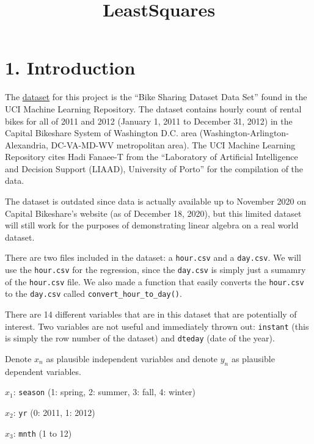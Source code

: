 \documentclass[
]{article}
\title{LeastSquares}
\author{}
\date{\vspace{-2.5em}}
\begin{document}
\maketitle

\newpage

\hypertarget{introduction}{%
\section{1. Introduction}\label{introduction}}

The \color{blue}
\href{https://www.archive.ics.uci.edu/ml/datasets/Bike+Sharing+Dataset}{dataset}
\color{black} for this project is the ``Bike Sharing Dataset Data Set''
found in the UCI Machine Learning Repository. The dataset contains
hourly count of rental bikes for all of 2011 and 2012 (January 1, 2011
to December 31, 2012) in the Capital Bikeshare System of Washington D.C.
area (Washington-Arlington-Alexandria, DC-VA-MD-WV metropolitan area).
The UCI Machine Learning Repository cites Hadi Fanaee-T from the
``Laboratory of Artificial Intelligence and Decision Support (LIAAD),
University of Porto'' for the compilation of the data.

The dataset is outdated since data is actually available up to November
2020 on Capital Bikeshare's website (as of December 18, 2020), but this
limited dataset will still work for the purposes of demonstrating linear
algebra on a real world dataset.

There are two files included in the dataset: a \texttt{hour.csv} and a
\texttt{day.csv}. We will use the \texttt{hour.csv} for the regression,
since the \texttt{day.csv} is simply just a sumamry of the
\texttt{hour.csv} file. We also made a function that easily converts the
\texttt{hour.csv} to the \texttt{day.csv} called
\texttt{convert\_hour\_to\_day()}.

There are 14 different variables that are in this dataset that are
potentially of interest. Two variables are not useful and immediately
thrown out: \texttt{instant} (this is simply the row number of the
dataset) and \texttt{dteday} (date of the year).

Denote \(x_{n}\) as plausible independent variables and denote \(y_{n}\)
as plausible dependent variables.

\(x_{1}\): \texttt{season} (1: spring, 2: summer, 3: fall, 4: winter)

\(x_{2}\): \texttt{yr} (0: 2011, 1: 2012)

\(x_{3}\): \texttt{mnth} (1 to 12)
\end{document}
